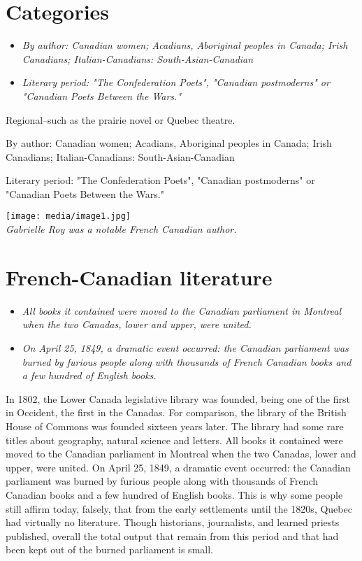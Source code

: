 \section{Categories}\label{categories}

\begin{itemize}
\item
  \emph{By author: Canadian women; Acadians, Aboriginal peoples in
  Canada; Irish Canadians; Italian-Canadians: South-Asian-Canadian}
\item
  \emph{Literary period: "The Confederation Poets", "Canadian
  postmoderns" or "Canadian Poets Between the Wars."}
\end{itemize}

Regional--such as the prairie novel or Quebec theatre.

By author: Canadian women; Acadians, Aboriginal peoples in Canada; Irish
Canadians; Italian-Canadians: South-Asian-Canadian

Literary period: "The Confederation Poets", "Canadian postmoderns" or
"Canadian Poets Between the Wars."

\texttt{[image: media/image1.jpg]}\\
\emph{Gabrielle Roy was a notable French Canadian author.}

\section{French-Canadian literature}\label{french-canadian-literature}

\begin{itemize}
\item
  \emph{All books it contained were moved to the Canadian parliament in
  Montreal when the two Canadas, lower and upper, were united.}
\item
  \emph{On April 25, 1849, a dramatic event occurred: the Canadian
  parliament was burned by furious people along with thousands of French
  Canadian books and a few hundred of English books.}
\end{itemize}

In 1802, the Lower Canada legislative library was founded, being one of
the first in Occident, the first in the Canadas. For comparison, the
library of the British House of Commons was founded sixteen years later.
The library had some rare titles about geography, natural science and
letters. All books it contained were moved to the Canadian parliament in
Montreal when the two Canadas, lower and upper, were united. On April
25, 1849, a dramatic event occurred: the Canadian parliament was burned
by furious people along with thousands of French Canadian books and a
few hundred of English books. This is why some people still affirm
today, falsely, that from the early settlements until the 1820s, Quebec
had virtually no literature. Though historians, journalists, and learned
priests published, overall the total output that remain from this period
and that had been kept out of the burned parliament is small.

